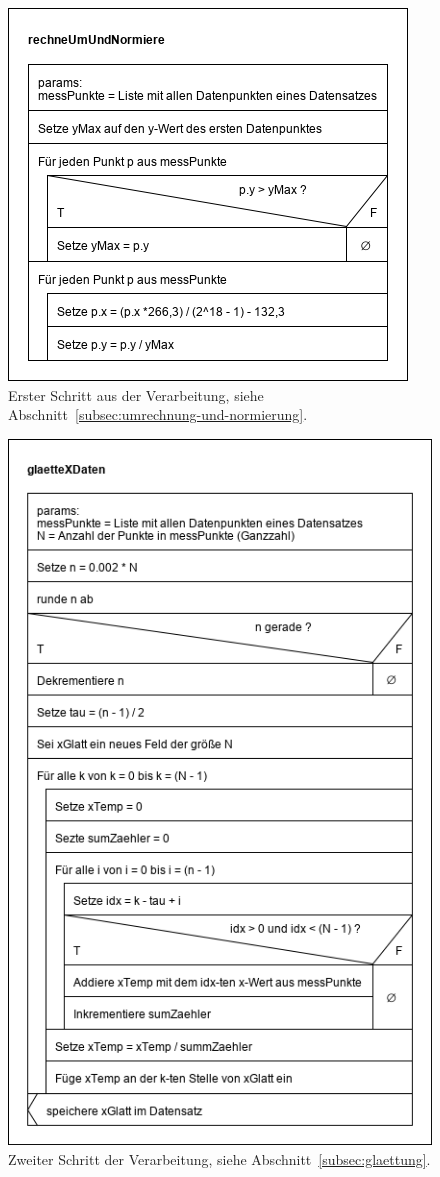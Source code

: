 \begin{figure}[htb]
    \centering
    \includegraphics[width=0.7\linewidth]{images/rechneUmUndNormiere}
    \caption{
        Erster Schritt aus der Verarbeitung, siehe Abschnitt~\ref{subsec:umrechnung-und-normierung}.
    }
    \label{fig:umrechnung-normierung}
\end{figure}
\begin{figure}[htb]
    \centering
    \includegraphics[width=0.7\linewidth]{images/glaetteXDaten}
    \caption{
        Zweiter Schritt der Verarbeitung, siehe Abschnitt~\ref{subsec:glaettung}.
    }
    \label{fig:glaettung-fig}
\end{figure}

